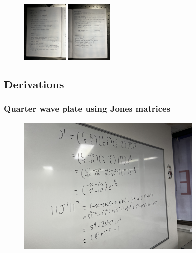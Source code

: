 \documentclass{article}
\begin{document}
\begin{figure}[H]
    \hspace{0.5cm}
    \includegraphics[width=0.2\textwidth,angle=270,origin=c]{labbook8.jpg}
    \vspace{0.5cm}
    \includegraphics[width=0.2\textwidth,angle=270,origin=c]{labbook9.jpg}
\end{figure}

\subsection{Derivations}
\subsubsection{Quarter wave plate using Jones matrices}\label{eq:derivation}
\begin{figure}[H]
    \centering
    \includegraphics[width=0.8\textwidth]{circpol.jpg}
\end{figure}
\end{document}
